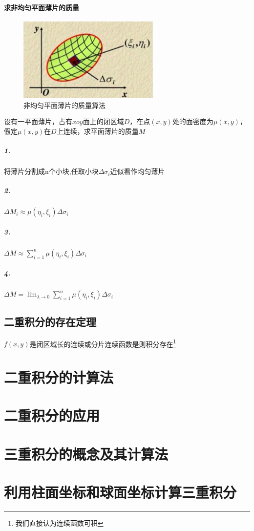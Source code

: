 \documentclass{ctexart}
\begin{document}
      \paragraph{求非均匀平面薄片的质量}
      \begin{figure}[htb]
        \centering
        \caption{非均匀平面薄片的质量算法}
        \includegraphics[width = 7cm]{PictrueNote/M.png}
      \end{figure}
        设有一平面薄片，占有$xoy$面上的闭区域$D$，在点$(x,y)$处的面密度为$\mu (x,y)$，假定$\mu(x,y)$在$D$上连续，求平面薄片的质量$M$
          \subparagraph{1.}将薄片分割成n个小块,任取小块$\Delta \sigma_i$近似看作均匀薄片
          \subparagraph{2.}$\Delta M_i \approx \mu(\eta_i,\xi_i )\Delta \sigma_i$
          \subparagraph{3.}$\Delta M \approx  \sum_{i=1}^{n}\mu(\eta_i,\xi_i )\Delta \sigma_i$
          \subparagraph{4.}$\Delta M =  \lim_{\lambda \to 0}\sum_{i=1}^{n}\mu(\eta_i,\xi_i )\Delta \sigma_i$
  \subsection{二重积分的存在定理}
  $f(x,y)$是闭区域长的连续或分片连续函数是则积分存在\footnote{我们直接认为连续函数可积}
  \section{二重积分的计算法}
  \section{二重积分的应用}
  \section{三重积分的概念及其计算法}
  \section{利用柱面坐标和球面坐标计算三重积分}
\end{document}
